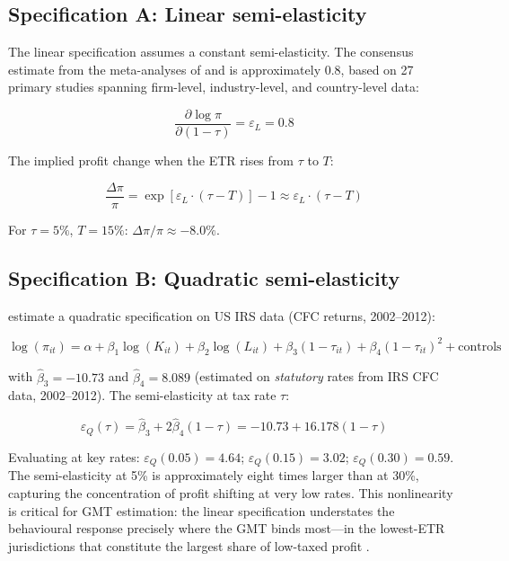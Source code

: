 \documentclass[11pt,a4paper]{article}
\begin{document}
\subsection{Specification A: Linear semi-elasticity}\label{sec:linear}

The linear specification assumes a constant semi-elasticity. The consensus estimate from the meta-analyses of \citet{heckemeyer2017} and \citet{beer2020} is approximately 0.8, based on 27 primary studies spanning firm-level, industry-level, and country-level data:

\begin{equation}\label{eq:linear_se}
\frac{\partial \log \pi}{\partial (1-\tau)} = \varepsilon_L = 0.8
\end{equation}

The implied profit change when the ETR rises from $\tau$ to $T$:

\begin{equation}\label{eq:linear_response}
\frac{\Delta \pi}{\pi} = \exp\!\left[\varepsilon_L \cdot (\tau - T)\right] - 1 \approx \varepsilon_L \cdot (\tau - T)
\end{equation}

For $\tau = 5\%$, $T = 15\%$: $\Delta\pi/\pi \approx -8.0\%$.

\subsection{Specification B: Quadratic semi-elasticity}\label{sec:quadratic}

\citet{dowd2017} estimate a quadratic specification on US IRS data (CFC returns, 2002--2012):

\begin{equation}\label{eq:dowd_spec}
\log(\pi_{it}) = \alpha + \beta_1 \log(K_{it}) + \beta_2 \log(L_{it}) + \beta_3 (1-\tau_{it}) + \beta_4 (1-\tau_{it})^2 + \text{controls}
\end{equation}

with $\hat{\beta}_3 = -10.73$ and $\hat{\beta}_4 = 8.089$ (estimated on \emph{statutory} rates from IRS CFC data, 2002--2012). The semi-elasticity at tax rate $\tau$:

\begin{equation}\label{eq:dowd_se}
\varepsilon_Q(\tau) = \hat{\beta}_3 + 2\hat{\beta}_4 (1-\tau) = -10.73 + 16.178(1-\tau)
\end{equation}

Evaluating at key rates: $\varepsilon_Q(0.05) = 4.64$; $\varepsilon_Q(0.15) = 3.02$; $\varepsilon_Q(0.30) = 0.59$. The semi-elasticity at 5\% is approximately eight times larger than at 30\%, capturing the concentration of profit shifting at very low rates. This nonlinearity is critical for GMT estimation: the linear specification understates the behavioural response precisely where the GMT binds most---in the lowest-ETR jurisdictions that constitute the largest share of low-taxed profit \citep{hugger2025}.
\end{document}
